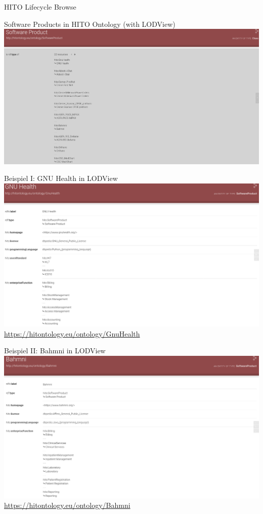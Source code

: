 \documentclass[aspectratio=1610,12pt]{beamer}
\begin{document}
\begin{frame}{HITO Lifecycle Browse}
  \centering
  \vspace{-0.5cm}
\end{frame}

\begin{frame}{Software Products in HITO Ontology (with LODView)}
\centering
\includegraphics[width=\textwidth]{img/softwareproduct.png}
\end{frame}

\begin{frame}{Beispiel I: GNU Health in LODView}
\vspace{-0.3cm}
\centering
\includegraphics[width=.95\textwidth]{img/GnuHealth.png}
\footnotesize{\url{https://hitontology.eu/ontology/GnuHealth}}
\end{frame}

\begin{frame}{Beispiel II: Bahmni in LODView}
\vspace{-0.3cm}
\centering
\includegraphics[width=.95\textwidth]{img/bahmni.png}
\footnotesize{\url{https://hitontology.eu/ontology/Bahmni}}
\end{frame}
\end{document}
